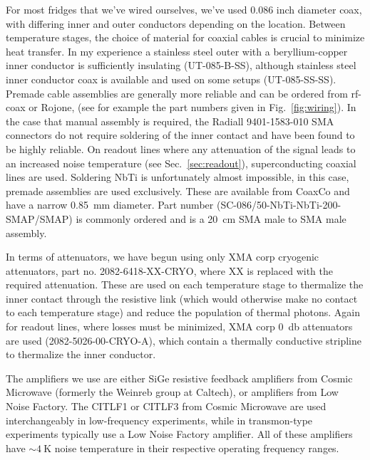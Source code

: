 For most fridges that we've wired ourselves, we've used 0.086 inch diameter coax, with differing inner and outer
conductors depending on the location. Between temperature stages, the choice of material for coaxial cables is
crucial to minimize heat transfer. In my experience a stainless steel outer with a beryllium-copper inner conductor is
sufficiently insulating (UT-085-B-SS), although stainless steel inner conductor coax is available and used on some
setups (UT-085-SS-SS). Premade cable assemblies are generally more reliable and can be ordered from rf-coax or Rojone,
(see for example the part numbers given in Fig.~\ref{fig:wiring}). In the case that manual assembly is required,
the Radiall 9401-1583-010 SMA connectors do not require soldering of the inner contact and have been found to be highly
reliable. On readout lines where any attenuation of the signal leads to an increased noise temperature
(see Sec.~\ref{sec:readout}), superconducting coaxial lines are used. Soldering NbTi is unfortunately almost
impossible, in this case, premade assemblies are used exclusively. These are available from CoaxCo and
have a narrow \SI{0.85}{\milli\meter} diameter. Part number (SC-086/50-NbTi-NbTi-200-SMAP/SMAP) is commonly
ordered and is a \SI{20}{\centi\meter} SMA male to SMA male assembly.

In terms of attenuators, we have begun using only XMA corp cryogenic attenuators, part no. 2082-6418-XX-CRYO,
where XX is replaced with the required attenuation. These are used on each temperature stage to thermalize
the inner contact through the resistive link (which would otherwise make no contact to each temperature stage)
and reduce the population of thermal photons. Again for readout lines, where losses must be minimized, XMA corp
\SI{0}{\decibel} attenuators are used (2082-5026-00-CRYO-A), which contain a thermally conductive stripline to
thermalize the inner conductor.

The amplifiers we use are either SiGe resistive feedback amplifiers from Cosmic Microwave (formerly the Weinreb group
at Caltech), or amplifiers from Low Noise Factory. The CITLF1 or CITLF3 from Cosmic Microwave are used interchangeably in
low-frequency experiments, while in transmon-type experiments typically use a Low Noise Factory amplifier. All of these amplifiers
have $\sim \SI{4}{\kelvin}$ noise temperature in their respective operating frequency ranges.

